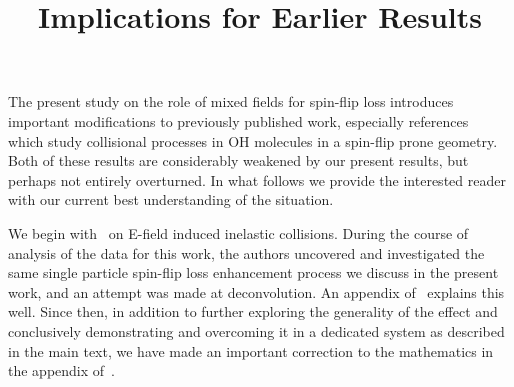 \documentclass[%
 reprint,
 amsmath,amssymb,
 aps,
prl,
]{revtex4-1}
\begin{document}

\title{Implications for Earlier Results}%







\maketitle



The present study on the role of mixed fields for spin-flip loss introduces important modifications to previously published work, especially references~\cite{Stuhl2012evap,Stuhl2013} which study collisional processes in OH molecules in a spin-flip prone geometry. 
Both of these results are considerably weakened by our present results, but perhaps not entirely overturned. 
In what follows we provide the interested reader with our current best understanding of the situation.

We begin with~\cite{Stuhl2013} on E-field induced inelastic collisions. 
During the course of analysis of the data for this work, the authors uncovered and investigated the same single particle spin-flip loss enhancement process we discuss in the present work, and an attempt was made at deconvolution. 
An appendix of~\cite{Stuhl2013} explains this well. 
Since then, in addition to further exploring the generality of the effect and conclusively demonstrating and overcoming it in a dedicated system as described in the main text, we have made an important correction to the mathematics in the appendix of~\cite{Stuhl2013}.
\end{document}
